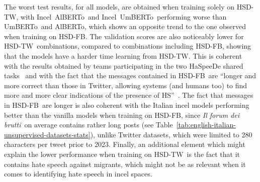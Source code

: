 \documentclass[11pt]{article}
\newcommand{\dsITclassification}{IFS-IT}
\newcommand{\umbert}{\mbox{UmBERTo}}
\newcommand{\albert}{\mbox{AlBERTo}}
\newcommand{\iumbert}{\mbox{Incel UmBERTo}}
\newcommand{\ialbert}{\mbox{Incel AlBERTo}}
\newcommand{\hsdfb}{\mbox{HSD-FB}}
\newcommand{\hsdtw}{\mbox{HSD-TW}}
\newcommand{\itforum}{\textit{Il forum dei brutti}}
\begin{document}
The worst test results, for all models, are obtained when training solely on \hsdtw, with \ialbert\, and \iumbert\, performing worse than \umbert\, and \albert, which shows an opposite trend to the one observed when training on \hsdfb.
The validation scores are also noticeably lower for \hsdtw\, combinations, compared to combinations including \hsdfb, showing that the models have a harder time learning from \hsdtw. This is coherent with the results obtained by teams participating in the two HaSpeeDe shared tasks~\cite{boscoOverviewEVALITA2018,basileEVALITA2020Overview} and with the fact that the messages contained in \hsdfb\, are ``longer and more correct than those in Twitter, allowing systems (and humans too) to find more and more clear indications of the presence of HS''~\cite{boscoOverviewEVALITA2018}.
The fact that messages in \hsdfb\, are longer is also coherent with the Italian incel models performing better than the vanilla models when training on \hsdfb, since \itforum\, on average contains rather long posts (see Table~\ref{tab:english-italian-unsupervised-datasets-stats}), unlike Twitter datasets, which were limited to 280 characters per tweet prior to 2023.
Finally, an additional element which might explain the lower performance when training on \hsdtw\, is the fact that it contains hate speech against migrants, which might not be as relevant when it comes to identifying hate speech in incel spaces.
\end{document}
